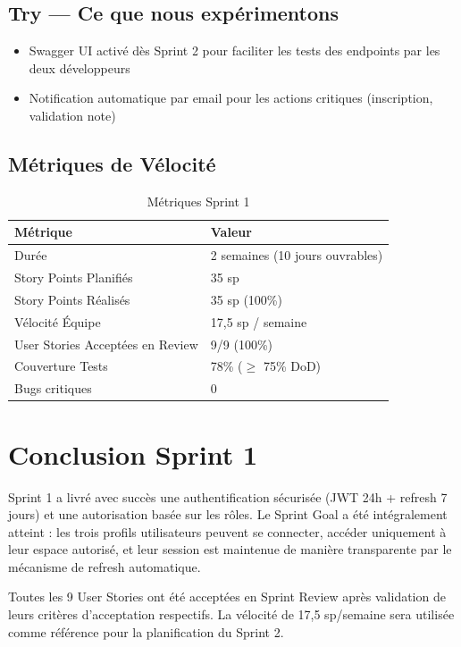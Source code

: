 \documentclass[12pt,a4paper]{report}
\begin{document}
\subsection{Try — Ce que nous expérimentons}

\begin{itemize}[itemsep=0.3em]
    \item Swagger UI activé dès Sprint 2 pour faciliter les tests des endpoints par les deux développeurs
    \item Notification automatique par email pour les actions critiques (inscription, validation note)
\end{itemize}

\subsection{Métriques de Vélocité}

\begin{table}[H]
\centering
\caption{Métriques Sprint 1}
\begin{tabular}{|p{5cm}|p{8cm}|}
\hline
\textbf{Métrique} & \textbf{Valeur} \\
\hline
Durée & 2 semaines (10 jours ouvrables) \\
\hline
Story Points Planifiés & 35 sp \\
\hline
Story Points Réalisés & 35 sp (100\%) \\
\hline
Vélocité Équipe & 17,5 sp / semaine \\
\hline
User Stories Acceptées en Review & 9/9 (100\%) \\
\hline
Couverture Tests & 78\% ($\geq$ 75\% DoD) \\
\hline
Bugs critiques & 0 \\
\hline
\end{tabular}
\end{table}

\section{Conclusion Sprint 1}

Sprint 1 a livré avec succès une authentification sécurisée (JWT 24h + refresh 7 jours) et une autorisation basée sur les rôles. Le Sprint Goal a été intégralement atteint : les trois profils utilisateurs peuvent se connecter, accéder uniquement à leur espace autorisé, et leur session est maintenue de manière transparente par le mécanisme de refresh automatique.

Toutes les 9 User Stories ont été acceptées en Sprint Review après validation de leurs critères d'acceptation respectifs. La vélocité de 17,5 sp/semaine sera utilisée comme référence pour la planification du Sprint 2.
\end{document}
